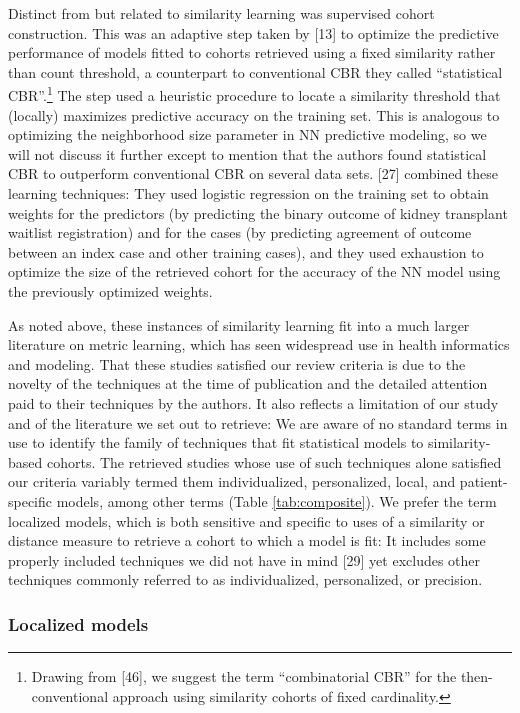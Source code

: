 \documentclass[preprint, 3p,
authoryear]{elsarticle} %
\begin{document}
Distinct from but related to similarity learning was supervised cohort
construction. This was an adaptive step taken by {[}13{]} to optimize
the predictive performance of models fitted to cohorts retrieved using a
fixed similarity rather than count threshold, a counterpart to
conventional CBR they called ``statistical CBR''.\footnote{Drawing from
  {[}46{]}, we suggest the term ``combinatorial CBR'' for the
  then-conventional approach using similarity cohorts of fixed
  cardinality.} The step used a heuristic procedure to locate a
similarity threshold that (locally) maximizes predictive accuracy on the
training set. This is analogous to optimizing the neighborhood size
parameter in NN predictive modeling, so we will not discuss it further
except to mention that the authors found statistical CBR to outperform
conventional CBR on several data sets. {[}27{]} combined these learning
techniques: They used logistic regression on the training set to obtain
weights for the predictors (by predicting the binary outcome of kidney
transplant waitlist registration) and for the cases (by predicting
agreement of outcome between an index case and other training cases),
and they used exhaustion to optimize the size of the retrieved cohort
for the accuracy of the NN model using the previously optimized weights.

As noted above, these instances of similarity learning fit into a much
larger literature on metric learning, which has seen widespread use in
health informatics and modeling. That these studies satisfied our review
criteria is due to the novelty of the techniques at the time of
publication and the detailed attention paid to their techniques by the
authors. It also reflects a limitation of our study and of the
literature we set out to retrieve: We are aware of no standard terms in
use to identify the family of techniques that fit statistical models to
similarity-based cohorts. The retrieved studies whose use of such
techniques alone satisfied our criteria variably termed them
individualized, personalized, local, and patient-specific models, among
other terms (Table \ref{tab:composite}). We prefer the term localized
models, which is both sensitive and specific to uses of a similarity or
distance measure to retrieve a cohort to which a model is fit: It
includes some properly included techniques we did not have in mind
{[}29{]} yet excludes other techniques commonly referred to as
individualized, personalized, or precision.

\hypertarget{localized-models}{%
\subsubsection{Localized models}\label{localized-models}}
\end{document}
